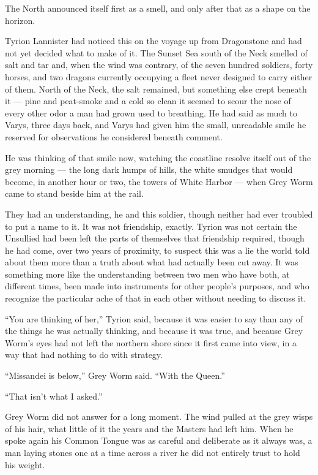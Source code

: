 The North announced itself first as a smell, and only after that as a shape on the horizon.

Tyrion Lannister had noticed this on the voyage up from Dragonstone and had not yet decided what to make of it. The Sunset Sea south of the Neck smelled of salt and tar and, when the wind was contrary, of the seven hundred soldiers, forty horses, and two dragons currently occupying a fleet never designed to carry either of them. North of the Neck, the salt remained, but something else crept beneath it — pine and peat-smoke and a cold so clean it seemed to scour the nose of every other odor a man had grown used to breathing. He had said as much to Varys, three days back, and Varys had given him the small, unreadable smile he reserved for observations he considered beneath comment.

He was thinking of that smile now, watching the coastline resolve itself out of the grey morning — the long dark humps of hills, the white smudges that would become, in another hour or two, the towers of White Harbor — when Grey Worm came to stand beside him at the rail.

They had an understanding, he and this soldier, though neither had ever troubled to put a name to it. It was not friendship, exactly. Tyrion was not certain the Unsullied had been left the parts of themselves that friendship required, though he had come, over two years of proximity, to suspect this was a lie the world told about them more than a truth about what had actually been cut away. It was something more like the understanding between two men who have both, at different times, been made into instruments for other people’s purposes, and who recognize the particular ache of that in each other without needing to discuss it.

“You are thinking of her,” Tyrion said, because it was easier to say than any of the things he was actually thinking, and because it was true, and because Grey Worm’s eyes had not left the northern shore since it first came into view, in a way that had nothing to do with strategy.

“Missandei is below,” Grey Worm said. “With the Queen.”

“That isn’t what I asked.”

Grey Worm did not answer for a long moment. The wind pulled at the grey wisps of his hair, what little of it the years and the Masters had left him. When he spoke again his Common Tongue was as careful and deliberate as it always was, a man laying stones one at a time across a river he did not entirely trust to hold his weight.

